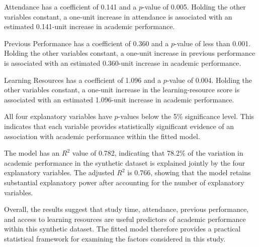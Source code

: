 Attendance has a coefficient of 0.141 and a $p$-value of 0.005. Holding the other variables constant, a one-unit increase in attendance is associated with an estimated 0.141-unit increase in academic performance.

Previous Performance has a coefficient of 0.360 and a $p$-value of less than 0.001. Holding the other variables constant, a one-unit increase in previous performance is associated with an estimated 0.360-unit increase in academic performance.

Learning Resources has a coefficient of 1.096 and a $p$-value of 0.004. Holding the other variables constant, a one-unit increase in the learning-resource score is associated with an estimated 1.096-unit increase in academic performance.

All four explanatory variables have $p$-values below the 5\% significance level. This indicates that each variable provides statistically significant evidence of an association with academic performance within the fitted model.

The model has an $R^2$ value of 0.782, indicating that 78.2\% of the variation in academic performance in the synthetic dataset is explained jointly by the four explanatory variables. The adjusted $R^2$ is 0.766, showing that the model retains substantial explanatory power after accounting for the number of explanatory variables.

Overall, the results suggest that study time, attendance, previous performance, and access to learning resources are useful predictors of academic performance within this synthetic dataset. The fitted model therefore provides a practical statistical framework for examining the factors considered in this study.